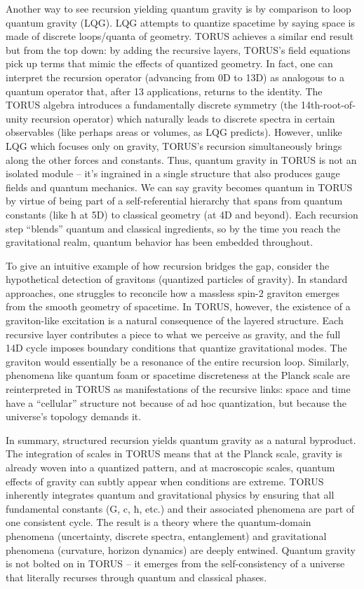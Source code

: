 \documentclass[
]{article}
\begin{document}
Another way to see recursion yielding quantum gravity is by comparison
to loop quantum gravity (LQG). LQG attempts to quantize spacetime by
saying space is made of discrete loops/quanta of geometry. TORUS
achieves a similar end result but from the top down: by adding the
recursive layers, TORUS's field equations pick up terms that mimic the
effects of quantized geometry. In fact, one can interpret the recursion
operator (advancing from 0D to 13D) as analogous to a quantum operator
that, after 13 applications, returns to the identity. The TORUS algebra
introduces a fundamentally discrete symmetry (the 14th-root-of-unity
recursion operator) which naturally leads to discrete spectra in certain
observables (like perhaps areas or volumes, as LQG predicts). However,
unlike LQG which focuses only on gravity, TORUS's recursion
simultaneously brings along the other forces and constants. Thus,
quantum gravity in TORUS is not an isolated module -- it's ingrained in
a single structure that also produces gauge fields and quantum
mechanics. We can say gravity becomes quantum in TORUS by virtue of
being part of a self-referential hierarchy that spans from quantum
constants (like ħ at 5D) to classical geometry (at 4D and beyond). Each
recursion step ``blends'' quantum and classical ingredients, so by the
time you reach the gravitational realm, quantum behavior has been
embedded throughout.

To give an intuitive example of how recursion bridges the gap, consider
the hypothetical detection of gravitons (quantized particles of
gravity). In standard approaches, one struggles to reconcile how a
massless spin-2 graviton emerges from the smooth geometry of spacetime.
In TORUS, however, the existence of a graviton-like excitation is a
natural consequence of the layered structure. Each recursive layer
contributes a piece to what we perceive as gravity, and the full 14D
cycle imposes boundary conditions that quantize gravitational modes. The
graviton would essentially be a resonance of the entire recursion loop.
Similarly, phenomena like quantum foam or spacetime discreteness at the
Planck scale are reinterpreted in TORUS as manifestations of the
recursive links: space and time have a ``cellular'' structure not
because of ad hoc quantization, but because the universe's topology
demands it.

In summary, structured recursion yields quantum gravity as a natural
byproduct. The integration of scales in TORUS means that at the Planck
scale, gravity is already woven into a quantized pattern, and at
macroscopic scales, quantum effects of gravity can subtly appear when
conditions are extreme. TORUS inherently integrates quantum and
gravitational physics by ensuring that all fundamental constants (G, c,
ħ, etc.) and their associated phenomena are part of one consistent
cycle. The result is a theory where the quantum-domain phenomena
(uncertainty, discrete spectra, entanglement) and gravitational
phenomena (curvature, horizon dynamics) are deeply entwined. Quantum
gravity is not bolted on in TORUS -- it emerges from the
self-consistency of a universe that literally recurses through quantum
and classical phases.
\end{document}
